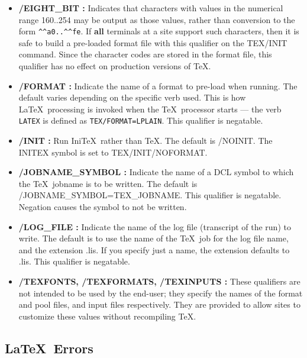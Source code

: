 \begin{itemize}
\item  {\bf   /EIGHT\_BIT :} Indicates that characters with values in the 
numerical range 160..254 may be output as those values, rather than conversion 
to the form \verb+^^a0..^^fe+. If {\bf all} terminals at a site support such 
characters, then it is safe to build a pre-loaded format file with this 
qualifier on the TEX/INIT command. Since the character codes are stored in the 
format file, this qualifier has no effect on production versions of \TeX.

\item  {\bf   /FORMAT :} Indicate the name of a format to pre-load when
running. The default varies depending on the specific verb used. This is how
\LaTeX\ processing is invoked when the \TeX\ processor starts --- the verb
{\tt LATEX} is defined as \mbox{\tt TEX/FORMAT=LPLAIN}.
This qualifier is negatable.

\item  {\bf   /INIT  :} Run Ini\TeX\ rather than \TeX. The default is /NOINIT. 
The INITEX symbol is set to TEX/INIT/NOFORMAT.

\item  {\bf   /JOBNAME\_SYMBOL :} Indicate the name of a DCL symbol to which
the \TeX\ jobname is to be written. The default is 
/JOBNAME\_SYMBOL=TEX\_JOBNAME. This qualifier is negatable. Negation causes 
the symbol to not be written.

\item  {\bf   /LOG\_FILE :} Indicate the name of the log file (transcript of 
the run) to write. The default is to use the name of the \TeX\ job for the 
log file name, and the extension .lis. If you specify just a name, the
extension defaults to .lis. This qualifier is negatable.

\item  {\bf   /TEXFONTS,   /TEXFORMATS,     /TEXINPUTS :}  
These qualifiers are not intended to be used by the end-user; they specify the 
names of the format and pool files, and input files respectively. They are 
provided to allow sites to customize these values without recompiling \TeX.

\end{itemize}

\subsection{\LaTeX\ Errors}
\label{se:latexerrs}

